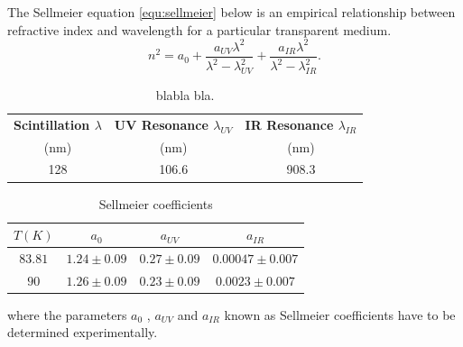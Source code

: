 \documentclass{article}
\begin{document}
The Sellmeier equation \ref{equ:sellmeier} below is an empirical relationship between refractive index and wavelength for a particular transparent medium.
\begin{equation}
n^2 = a_0 + \frac{a_{UV} \lambda^2}{\lambda^2 -\lambda^2_{UV}}+\frac{a_{IR}\lambda^2}{\lambda^2 - \lambda^2_{IR}}.
 \label{equ:sellmeier}
\end{equation}

 \begin{table}[h!]
  \begin{center}
    \label{tab:table3}
    \begin{tabular}{|c|c|c|} 
      \hline
      \textbf{ Scintillation $\lambda$} &\textbf{UV Resonance $\lambda_{UV}$} &\textbf{IR Resonance $\lambda_{IR}$}\\
 (nm)           & (nm)          &(nm) \\
      \hline
128 & 106.6 &908.3\\
      \hline
    \end{tabular}
  \end{center}
  \caption{blabla bla.}
 \end{table}
 
 \begin{table}[h!]
  \begin{center}
    \label{tab:table4}
    \begin{tabular}{|c|c|c|c|} 
      \hline
\textbf{ $T (K) $}& \textbf{ $a_0$} & \textbf{ $a_{UV}$} & \textbf{ $a_{IR}$ }\\
\hline
      $83.81$ & $1.24\pm0.09$ & $0.27\pm0.09$ & $0.00047\pm0.007$ \\
$90$ & $1.26\pm 0.09$& $0.23\pm 0.09$ & $0.0023\pm0.007$ \\
      \hline
    \end{tabular}
  \end{center}
  \caption{Sellmeier coefficients}
 \end{table}
 
where the parameters $a_0$ , $a_{UV}$ and $a_{IR}$ known as Sellmeier coefficients have to be determined
experimentally.
 

 
\end{document}
